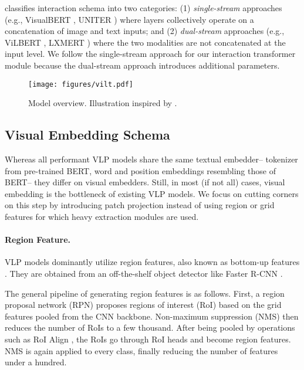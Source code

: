 \documentclass{article}
\begin{document}
\citet{bugliarello2020multimodal} classifies interaction schema into two categories: (1) \textit{single-stream} approaches (e.g., VisualBERT \citep{li2019visualbert}, UNITER \citep{chen2019uniter}) where layers collectively operate on a concatenation of image and text inputs; and (2) \textit{dual-stream} approaches (e.g., ViLBERT \citep{lu2019vilbert}, LXMERT \citep{tan2019lxmert}) where the two modalities are not concatenated at the input level. 
We follow the single-stream approach for our interaction transformer module because the dual-stream approach introduces additional parameters.

\begin{figure*}[t]
    \centering
    \texttt{[image: figures/vilt.pdf]}
    \caption{Model overview. Illustration inspired by \citet{dosovitskiy2020image}.}
    \label{fig:vilt}
\end{figure*}

\subsection{Visual Embedding Schema}

Whereas all performant VLP models share the same textual embedder-- tokenizer from pre-trained BERT, word and position embeddings resembling those of BERT-- they differ on visual embedders.
Still, in most (if not all) cases, visual embedding is the bottleneck of existing VLP models.
We focus on cutting corners on this step by introducing patch projection instead of using region or grid features for which heavy extraction modules are used.

\paragraph{Region Feature.}
VLP models dominantly utilize region features, also known as bottom-up features \citep{anderson2018bottom}.
They are obtained from an off-the-shelf object detector like Faster R-CNN \citep{ren2016faster}.

The general pipeline of generating region features is as follows. First, a region proposal network (RPN) proposes regions of interest (RoI) based on the grid features pooled from the CNN backbone. Non-maximum suppression (NMS) then reduces the number of RoIs to a few thousand. After being pooled by operations such as RoI Align \citep{he2017mask}, the RoIs go through RoI heads and become region features. NMS is again applied to every class, finally reducing the number of features under a hundred.
\end{document}
